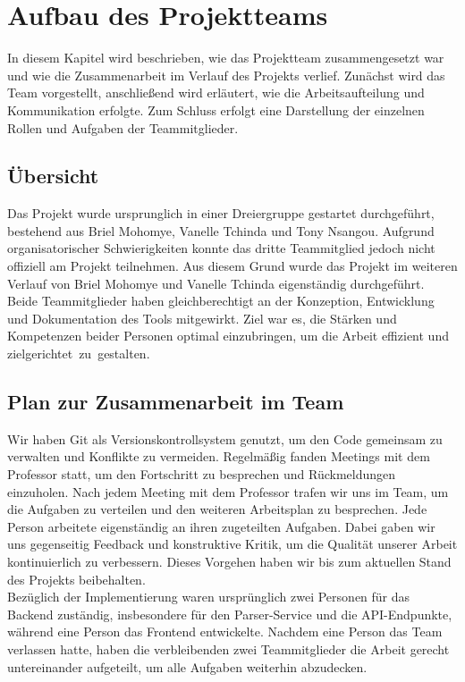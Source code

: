 \chapter{Aufbau des Projektteams}
In diesem Kapitel wird beschrieben, wie das Projektteam zusammengesetzt war 
und wie die Zusammenarbeit im Verlauf des Projekts verlief. Zunächst 
wird das Team vorgestellt, anschließend wird erläutert, wie die 
Arbeitsaufteilung und Kommunikation erfolgte. Zum Schluss erfolgt eine 
Darstellung der einzelnen Rollen und Aufgaben der Teammitglieder.

\section{Übersicht}
Das Projekt wurde ursprunglich in einer Dreiergruppe gestartet durchgeführt, 
bestehend aus Briel Mohomye, Vanelle Tchinda und Tony Nsangou. Aufgrund 
organisatorischer Schwierigkeiten konnte das dritte Teammitglied jedoch 
nicht offiziell am Projekt teilnehmen. Aus diesem Grund wurde das Projekt 
im weiteren Verlauf von Briel Mohomye und Vanelle Tchinda eigenständig 
durchgeführt. Beide Teammitglieder haben gleichberechtigt an der Konzeption, 
Entwicklung und Dokumentation des Tools mitgewirkt. Ziel war es, 
die Stärken und Kompetenzen beider Personen optimal einzubringen, 
um die Arbeit effizient und zielgerichtet zu gestalten.

\section{Plan zur Zusammenarbeit im Team}
Wir haben Git als Versionskontrollsystem genutzt, um den Code gemeinsam zu
verwalten und Konflikte zu vermeiden. Regelmäßig fanden Meetings mit dem Professor  statt, 
um den Fortschritt zu besprechen und Rückmeldungen einzuholen. Nach jedem 
Meeting mit dem Professor trafen wir uns im Team, um die Aufgaben zu 
verteilen und den weiteren Arbeitsplan zu besprechen.
Jede Person arbeitete eigenständig an ihren zugeteilten Aufgaben.
Dabei gaben wir uns gegenseitig Feedback und konstruktive Kritik,
um die Qualität unserer Arbeit kontinuierlich zu verbessern. 
Dieses Vorgehen haben wir bis zum aktuellen Stand des Projekts beibehalten.\\

\noindent Bezüglich der Implementierung waren ursprünglich zwei Personen für das Backend zuständig,
insbesondere für den Parser-Service und die API-Endpunkte, während eine Person
das Frontend entwickelte. Nachdem eine Person das Team verlassen hatte,
haben die verbleibenden zwei Teammitglieder die Arbeit gerecht untereinander aufgeteilt, 
um alle Aufgaben weiterhin abzudecken.


